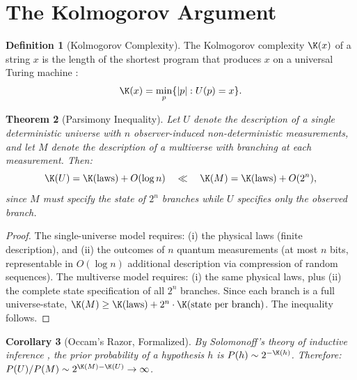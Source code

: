 \documentclass[12pt, a4paper]{article}
\theoremstyle{plain}
\newtheorem{theorem}{Theorem}[section]
\newtheorem{corollary}[theorem]{Corollary}
\theoremstyle{definition}
\newtheorem{definition}[theorem]{Definition}
\begin{document}
\section{The Kolmogorov Argument}\label{sec:kolmogorov}

\begin{definition}[Kolmogorov Complexity]\label{def:kolmogorov}
  The Kolmogorov complexity $\K(x)$ of a string $x$ is the length of the
  shortest program that produces $x$ on a universal Turing machine
  \citep{Kolmogorov1965, LiVitanyi2008}:
  \begin{equation}
    \K(x) = \min_{p} \{ |p| : U(p) = x \}.
  \end{equation}
\end{definition}

\begin{theorem}[Parsimony Inequality]\label{thm:parsimony}
  Let $U$ denote the description of a single deterministic universe with
  $n$ observer-induced non-deterministic measurements, and let $M$ denote
  the description of a multiverse with branching at each measurement.
  Then:
  \begin{equation}\label{eq:parsimony}
    \K(U) = \K(\text{laws}) + O(\log n)
    \quad \ll \quad
    \K(M) = \K(\text{laws}) + O(2^n),
  \end{equation}
  since $M$ must specify the state of $2^n$ branches while $U$ specifies
  only the observed branch.
\end{theorem}

\begin{proof}
  The single-universe model requires: (i) the physical laws (finite
  description), and (ii) the outcomes of $n$ quantum measurements (at most
  $n$ bits, representable in $O(\log n)$ additional description via
  compression of random sequences). The multiverse model requires: (i) the
  same physical laws, plus (ii) the complete state specification of all
  $2^n$ branches. Since each branch is a full universe-state, $\K(M) \geq
  \K(\text{laws}) + 2^n \cdot \K(\text{state per branch})$. The inequality
  follows. \qedhere
\end{proof}

\begin{corollary}[Occam's Razor, Formalized]\label{cor:occam}
  By Solomonoff's theory of inductive inference \citep{Solomonoff1964},
  the prior probability of a hypothesis $h$ is $P(h) \sim 2^{-\K(h)}$.
  Therefore: $P(U) / P(M) \sim 2^{\K(M) - \K(U)} \to \infty$.
\end{corollary}
\end{document}
